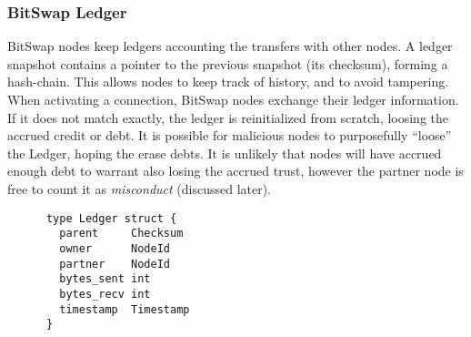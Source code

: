 \documentclass{sig-alternate}
\begin{document}




\subsubsection{BitSwap Ledger}

BitSwap nodes keep ledgers accounting the transfers with other nodes.
A ledger snapshot contains a pointer to the previous snapshot (its checksum),
forming a hash-chain. This allows nodes to keep track of history, and to avoid
tampering. When activating a connection, BitSwap nodes exchange their ledger
information.
If it does not match exactly, the ledger is reinitialized from scratch,
loosing the accrued credit or debt.  It is possible for malicious nodes to
purposefully ``loose'' the Ledger, hoping the erase debts. It is unlikely that
nodes will have accrued enough debt to warrant also losing the accrued trust,
however the partner node is free to count it as \textit{misconduct} (discussed
later).

\begin{verbatim}
      type Ledger struct {
        parent     Checksum
        owner      NodeId
        partner    NodeId
        bytes_sent int
        bytes_recv int
        timestamp  Timestamp
      }
\end{verbatim}
\end{document}
